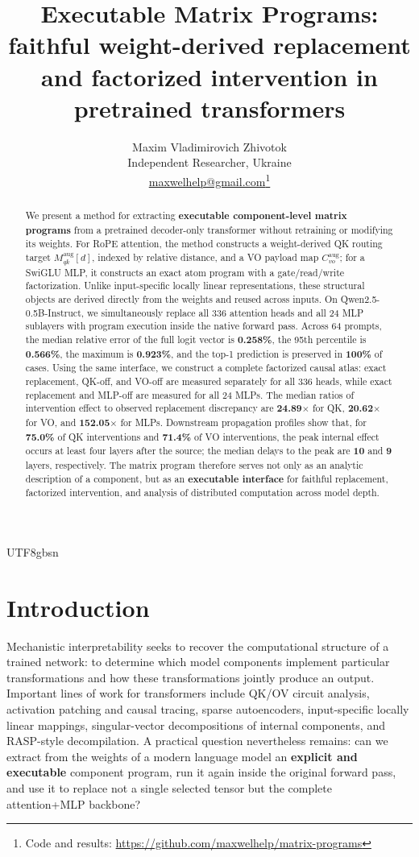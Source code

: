 \documentclass[11pt]{article}
\title{Executable Matrix Programs: faithful weight-derived replacement and factorized intervention in pretrained transformers}
\author{Maxim Vladimirovich Zhivotok\\\small Independent Researcher, Ukraine\\\small \href{mailto:maxwelhelp@gmail.com}{maxwelhelp@gmail.com}\thanks{Code and results: \url{https://github.com/maxwelhelp/matrix-programs}}}
\date{}
\begin{document}
\begin{CJK*}{UTF8}{gbsn}
\maketitle
\begin{abstract}
We present a method for extracting \textbf{executable component-level matrix programs} from a pretrained decoder-only transformer without retraining or modifying its weights. For RoPE attention, the method constructs a weight-derived QK routing target \(M^{\mathrm{aug}}_{qk}[d]\), indexed by relative distance, and a VO payload map \(C^{\mathrm{aug}}_{vo}\); for a SwiGLU MLP, it constructs an exact atom program with a gate/read/write factorization. Unlike input-specific locally linear representations, these structural objects are derived directly from the weights and reused across inputs. On Qwen2.5-0.5B-Instruct, we simultaneously replace all 336 attention heads and all 24 MLP sublayers with program execution inside the native forward pass. Across 64 prompts, the median relative error of the full logit vector is \textbf{0.258\%}, the 95th percentile is \textbf{0.566\%}, the maximum is \textbf{0.923\%}, and the top-1 prediction is preserved in \textbf{100\%} of cases. Using the same interface, we construct a complete factorized causal atlas: exact replacement, QK-off, and VO-off are measured separately for all 336 heads, while exact replacement and MLP-off are measured for all 24 MLPs. The median ratios of intervention effect to observed replacement discrepancy are \textbf{24.89$\times$} for QK, \textbf{20.62$\times$} for VO, and \textbf{152.05$\times$} for MLPs. Downstream propagation profiles show that, for \textbf{75.0\%} of QK interventions and \textbf{71.4\%} of VO interventions, the peak internal effect occurs at least four layers after the source; the median delays to the peak are \textbf{10} and \textbf{9} layers, respectively. The matrix program therefore serves not only as an analytic description of a component, but as an \textbf{executable interface} for faithful replacement, factorized intervention, and analysis of distributed computation across model depth.
\end{abstract}

\section{Introduction}

Mechanistic interpretability seeks to recover the computational
structure of a trained network: to determine which model components
implement particular transformations and how these transformations
jointly produce an output. Important lines of work for transformers
include QK/OV circuit analysis, activation patching and causal tracing,
sparse autoencoders, input-specific locally linear mappings,
singular-vector decompositions of internal components, and RASP-style
decompilation. A practical question nevertheless remains: can we extract
from the weights of a modern language model an \textbf{explicit and
executable} component program, run it again inside the original forward
pass, and use it to replace not a single selected tensor but the
complete attention+MLP backbone?


\end{CJK*}
\end{document}
